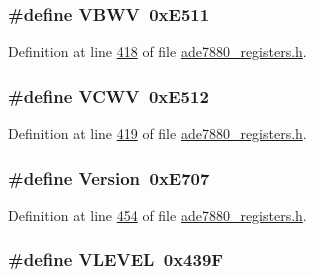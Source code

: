 \hypertarget{a00036_aede3d3efd022c6b37c33919e398feedc}{
\subsubsection[{V\-B\-W\-V}]{\setlength{\rightskip}{0pt plus 5cm}\#define V\-B\-W\-V~0x\-E511}}\label{de/d8c/a00036_aede3d3efd022c6b37c33919e398feedc}


Definition at line \hyperlink{a00036_source_l00418}{418} of file \hyperlink{a00036_source}{ade7880\-\_\-registers.\-h}.

\hypertarget{a00036_aba35b37f2923547e4ef6ef81ef23c179}{
\subsubsection[{V\-C\-W\-V}]{\setlength{\rightskip}{0pt plus 5cm}\#define V\-C\-W\-V~0x\-E512}}\label{de/d8c/a00036_aba35b37f2923547e4ef6ef81ef23c179}


Definition at line \hyperlink{a00036_source_l00419}{419} of file \hyperlink{a00036_source}{ade7880\-\_\-registers.\-h}.

\hypertarget{a00036_a00c9dad6cd91a4abb6062ea1efc82bd9}{
\subsubsection[{Version}]{\setlength{\rightskip}{0pt plus 5cm}\#define Version~0x\-E707}}\label{de/d8c/a00036_a00c9dad6cd91a4abb6062ea1efc82bd9}


Definition at line \hyperlink{a00036_source_l00454}{454} of file \hyperlink{a00036_source}{ade7880\-\_\-registers.\-h}.

\hypertarget{a00036_a601225f0680bfe13cf5fc0c2c52f37c5}{
\subsubsection[{V\-L\-E\-V\-E\-L}]{\setlength{\rightskip}{0pt plus 5cm}\#define V\-L\-E\-V\-E\-L~0x439\-F}}\label{de/d8c/a00036_a601225f0680bfe13cf5fc0c2c52f37c5}


